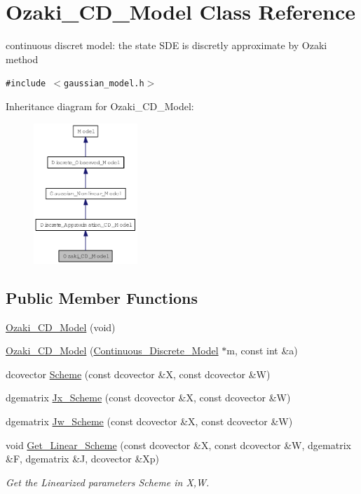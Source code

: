 \hypertarget{class_ozaki___c_d___model}{
\section{Ozaki\_\-CD\_\-Model Class Reference}
\label{class_ozaki___c_d___model}
}
continuous discret model: the state SDE is discretly approximate by Ozaki method  


{\tt \#include $<$gaussian\_\-model.h$>$}

Inheritance diagram for Ozaki\_\-CD\_\-Model:\nopagebreak
\begin{figure}[H]
\begin{center}
\leavevmode
\includegraphics[width=111pt]{class_ozaki___c_d___model__inherit__graph}
\end{center}
\end{figure}
\subsection*{Public Member Functions}
\begin{CompactItemize}
\item 
\hyperlink{class_ozaki___c_d___model_97b6866d8dc6ea653b686ed224d4dc48}{Ozaki\_\-CD\_\-Model} (void)
\item 
\hyperlink{class_ozaki___c_d___model_d3a96828c7830a244327f890f8b90a65}{Ozaki\_\-CD\_\-Model} (\hyperlink{class_continuous___discrete___model}{Continuous\_\-Discrete\_\-Model} $\ast$m, const int \&a)
\item 
dcovector \hyperlink{class_ozaki___c_d___model_394a9716158c403c06c4416f01e661a9}{Scheme} (const dcovector \&X, const dcovector \&W)
\item 
dgematrix \hyperlink{class_ozaki___c_d___model_6c4415b26674d1fc7b5e4f7499f35dd9}{Jx\_\-Scheme} (const dcovector \&X, const dcovector \&W)
\item 
dgematrix \hyperlink{class_ozaki___c_d___model_66009069506580d175c869cea3df3cd6}{Jw\_\-Scheme} (const dcovector \&X, const dcovector \&W)
\item 
void \hyperlink{class_ozaki___c_d___model_c0878d9dda14cd1294e2ce7e5ab9c281}{Get\_\-Linear\_\-Scheme} (const dcovector \&X, const dcovector \&W, dgematrix \&F, dgematrix \&J, dcovector \&Xp)
\begin{CompactList}\small\item\em Get the Linearized parameters Scheme in X,W. \item\end{CompactList}\end{CompactItemize}



